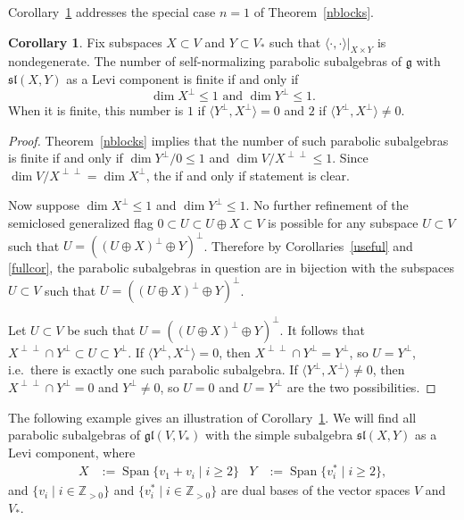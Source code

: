 \documentclass{amsart}
\theoremstyle{definition}
\newtheorem{cor}[theorem]{Corollary}
\theoremstyle{remark}
\numberwithin{equation}{section}
\newcommand {\Z} {\mathbb{Z}}
\def\gl{\mathfrak {gl}}
\def\g{\mathfrak {g}}
\def\sl{\mathfrak{sl}}
\newcommand {\Span}{\operatorname{Span}}
\begin{document}
Corollary~\ref{1block} addresses the special case $n=1$ of Theorem~\ref{nblocks}.


\begin{cor} \label{1block}
Fix subspaces $X \subset V$ and $Y \subset V_*$ such that $\langle \cdot , \cdot \rangle |_{X \times Y}$ is nondegenerate.  The number of self-normalizing parabolic subalgebras of $\g$ with $\sl(X,Y)$ as a Levi component is finite if and only if
$$\dim X^\perp \leq 1 \textrm{ and } \dim Y^\perp \leq 1.$$
When it is finite, this number is $1$ if $\langle Y^\perp , X^\perp \rangle = 0$ and $2$ if $\langle Y^\perp , X^\perp \rangle \neq 0$.
\end{cor}

\begin{proof}
Theorem~\ref{nblocks} implies that the number of such parabolic subalgebras is finite if and only if 
$\dim Y^\perp / 0 \leq 1$ and $\dim V / X^{\perp \perp} \leq 1$.  Since $\dim V / X^{\perp \perp} = \dim X^\perp$, the if and only if statement is clear.

Now suppose $\dim X^\perp \leq 1$ and $\dim Y^\perp \leq 1$.  No further refinement of the semiclosed generalized flag $0 \subset U \subset U \oplus X \subset V$ is possible for any subspace $U \subset V$ such that $U = ((U \oplus X)^\perp \oplus Y)^\perp$.  Therefore by Corollaries~\ref{useful} and \ref{fullcor}, the parabolic subalgebras in question are in bijection with the subspaces $U \subset V$ such that $U = ((U \oplus X)^\perp \oplus Y)^\perp$.  

Let $U \subset V$ be such that $U = ((U \oplus X)^\perp \oplus Y)^\perp$.  It follows that $X^{\perp \perp} \cap Y^\perp \subset U \subset Y^\perp$. 
 If $\langle Y^\perp , X^\perp \rangle = 0$, then $X^{\perp \perp} \cap Y^\perp = Y^\perp$, so $U = Y^\perp$, i.e.\ there is exactly one such parabolic subalgebra.  If $\langle Y^\perp, X^\perp \rangle \neq 0$, then $X^{\perp \perp} \cap Y^\perp=0$ and $Y^\perp \neq 0$, so $U=0$ and $U = Y^\perp$ are the two possibilities.
\end{proof}


The following example gives an illustration of Corollary~\ref{1block}.  
We will find all parabolic subalgebras of $\gl(V,V_*)$ with the simple subalgebra $\sl(X,Y)$ as a Levi component, where 
\begin{align*}
X & :=  \Span \{ v_1 + v_i \mid i \geq 2 \}  & Y & :=  \Span \{ v_i^* \mid i \geq 2 \},
\end{align*}
and $\{ v_i \mid i \in \Z_{> 0} \}$ and $\{ v_i^* \mid i \in \Z_{> 0} \}$ are dual bases of the vector spaces $V$ and $V_*$.  
\end{document}
